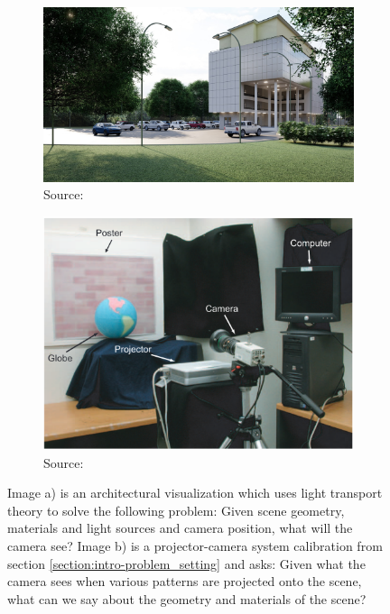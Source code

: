 \begin{figure}[ht]
    \centering
    \begin{subfigure}[b]{0.56\textwidth}
        \centering
        \includegraphics[width=\textwidth]{images/02-rendering.jpg}
        \caption{Source: \citet{ImageRendering}}
        \label{fig:background_light_transport_examples-rendering}
    \end{subfigure}
    \hfill
    \begin{subfigure}[b]{0.42\textwidth}
        \centering
        \includegraphics[width=\textwidth]{images/01-procam.png}
        \caption{Source: \citet{Grossberg2004}}
        \label{fig:background_light_transport_examples-procam}
    \end{subfigure}
    \caption{Image a) is an architectural visualization which uses light transport theory to solve the following problem: Given scene geometry, materials and light sources and camera position, what will the camera see? Image b) is a projector-camera system calibration from section \ref{section:intro-problem_setting} and asks: Given what the camera sees when various patterns are projected onto the scene, what can we say about the geometry and materials of the scene?}
    \label{fig:background_light_transport_examples}
\end{figure}

